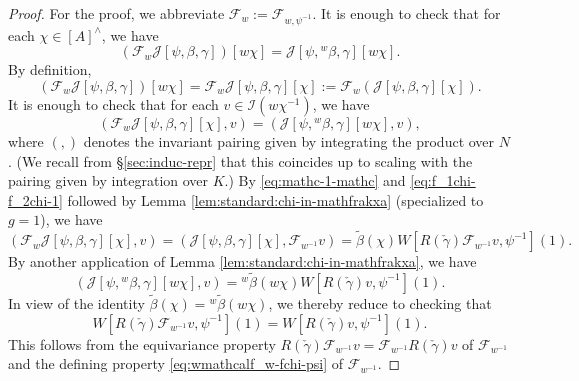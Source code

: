 \begin{proof}
  For the proof, we abbreviate $\mathcal{F}_w := \mathcal{F}_{w,\psi^{-1}}$.  It is enough to check that for each $\chi \in [A]^\wedge$, we have
  \begin{equation*}
    (\mathcal{F}_w \mathcal{J}[\psi,\beta,\gamma])[ w \chi] = \mathcal{J}[{\psi,{}^w \beta, \gamma}][w \chi].
  \end{equation*}
  By definition,
  \begin{equation*}
    (\mathcal{F}_w \mathcal{J}[\psi,\beta,\gamma])[ w \chi] = \mathcal{F}_w \mathcal{J}[\psi,\beta,\gamma][\chi]
    :=
    \mathcal{F}_w (\mathcal{J}[\psi,\beta,\gamma][\chi]).
  \end{equation*}
  It is enough to check that for each $v \in \mathcal{I}(w \chi^{-1})$, we have
  \begin{equation*}
    (\mathcal{F}_w \mathcal{J}[\psi,\beta,\gamma][\chi], v)
    =
    (\mathcal{J}[{\psi,{}^w \beta, \gamma}][w \chi], v),
  \end{equation*}
  where $(,)$ denotes the invariant pairing given by integrating the product over $N$.  (We recall from \S\ref{sec:induc-repr} that this coincides up to scaling with the pairing given by integration over $K$.)  By \eqref{eq:mathc-1-mathc} and \eqref{eq:f_1chi-f_2chi-1} followed by Lemma \ref{lem:standard:chi-in-mathfrakxa} (specialized to $g=1$), we have
  \begin{equation*}
    (\mathcal{F}_w \mathcal{J}[\psi,\beta,\gamma][\chi], v) = (\mathcal{J}[\psi,\beta,\gamma][\chi], \mathcal{F}_{w^{-1}} v)
    = \tilde{\beta}(\chi) W[R(\check{\gamma}) \mathcal{F}_{w^{-1}} v, \psi^{-1}](1).
  \end{equation*}
  By another application of Lemma \ref{lem:standard:chi-in-mathfrakxa}, we have
  \begin{equation*}
    (\mathcal{J}[\psi, {}^{w} \beta, \gamma][w \chi], v)
    = {}^{w} \tilde{\beta}(w \chi)
    W[R(\check{\gamma}) v, \psi^{-1}](1).
  \end{equation*}
  In view of the identity $\tilde{\beta}(\chi) = {}^w \tilde{\beta}(w \chi)$, we thereby reduce to checking that
  \begin{equation*}
    W[R(\check{\gamma}) \mathcal{F}_{w^{-1}} v, \psi^{-1}](1)
    =
    W[R(\check{\gamma}) v, \psi^{-1}](1).
  \end{equation*}
  This follows from the equivariance property $R(\check{\gamma}) \mathcal{F}_{w^{-1}} v = \mathcal{F}_{w^{-1}} R(\check{\gamma}) v$ of $\mathcal{F}_{w^{-1}}$ and the defining property \eqref{eq:wmathcalf_w-fchi-psi} of $\mathcal{F}_{w^{-1}}$.
\end{proof}

